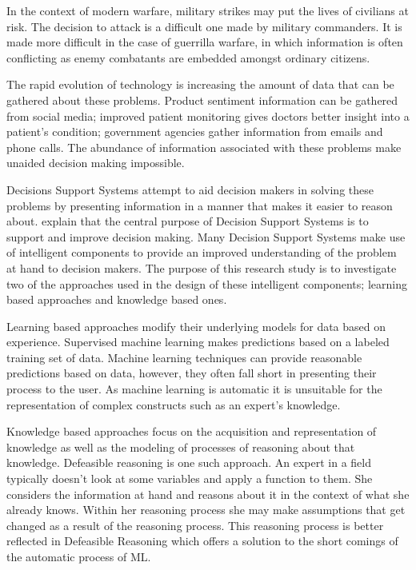 In the context of modern warfare, military strikes may put the lives of civilians at risk. The decision to attack is a difficult one made by military commanders. It is made more difficult in the case of guerrilla warfare, in which information is often conflicting as enemy combatants are embedded amongst ordinary citizens.

The rapid evolution of technology is increasing the amount of data that can be gathered about these problems. Product sentiment information can be gathered from social media; improved patient monitoring gives doctors better insight into a patient’s condition; government agencies gather information from emails and phone calls. The abundance of information associated with these problems make unaided decision making impossible. 

Decisions Support Systems attempt to aid decision makers in solving these problems by presenting information in a manner that makes it easier to reason about. \cite{turban2005decision} explain that the central purpose of Decision Support Systems is to support and improve decision making. Many Decision Support Systems make use of intelligent components to provide an improved understanding of the problem at hand to decision makers. The purpose of this research study is to investigate two of the approaches used in the design of these intelligent components; learning based approaches and knowledge based ones.

Learning based approaches modify their underlying models for data based on experience. Supervised machine learning makes predictions based on a labeled training set of data. Machine learning techniques can provide reasonable predictions based on data, however, they often fall short in presenting their process to the user. As machine learning is automatic it is unsuitable for the representation of complex constructs such as an expert's knowledge.

Knowledge based approaches focus on the acquisition and representation of knowledge as well as the modeling of processes of reasoning about that knowledge. Defeasible reasoning is one such approach. An expert in a field typically doesn't look at some variables and apply a function to them. She considers the information at hand and reasons about it in the context of what she already knows. Within her reasoning process she may make assumptions that get changed as a result of the reasoning process. This reasoning process is better reflected in Defeasible Reasoning which offers a solution to the short comings of the automatic process of ML.

